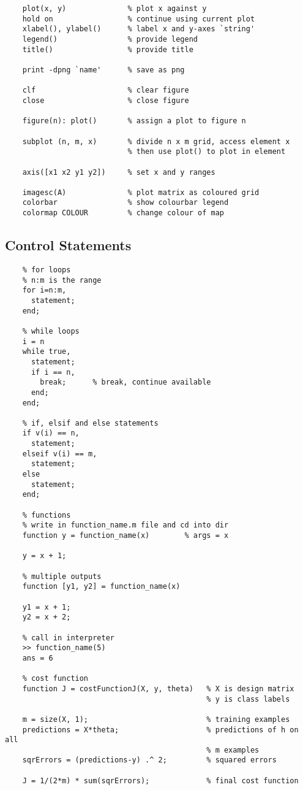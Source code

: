 \documentclass[12pt, a4paper]{article}
\begin{document}
    \begin{lstlisting}
    plot(x, y)              % plot x against y
    hold on                 % continue using current plot
    xlabel(), ylabel()      % label x and y-axes `string'
    legend()                % provide legend
    title()                 % provide title

    print -dpng `name'      % save as png

    clf                     % clear figure
    close                   % close figure

    figure(n): plot()       % assign a plot to figure n
    
    subplot (n, m, x)       % divide n x m grid, access element x
                            % then use plot() to plot in element

    axis([x1 x2 y1 y2])     % set x and y ranges

    imagesc(A)              % plot matrix as coloured grid
    colorbar                % show colourbar legend
    colormap COLOUR         % change colour of map
    \end{lstlisting}
    \vspace{1em}

  \subsection{Control Statements}

    \begin{lstlisting}
    % for loops
    % n:m is the range
    for i=n:m,
      statement;
    end;

    % while loops
    i = n
    while true,
      statement;
      if i == n,
        break;      % break, continue available
      end;
    end;

    % if, elsif and else statements
    if v(i) == n,
      statement;
    elseif v(i) == m,
      statement;
    else
      statement;
    end;

    % functions
    % write in function_name.m file and cd into dir
    function y = function_name(x)        % args = x

    y = x + 1;

    % multiple outputs
    function [y1, y2] = function_name(x)

    y1 = x + 1;
    y2 = x + 2;

    % call in interpreter
    >> function_name(5)
    ans = 6

    % cost function
    function J = costFunctionJ(X, y, theta)   % X is design matrix
                                              % y is class labels

    m = size(X, 1);                           % training examples 
    predictions = X*theta;                    % predictions of h on all 
                                              % m examples
    sqrErrors = (predictions-y) .^ 2;         % squared errors

    J = 1/(2*m) * sum(sqrErrors);             % final cost function
    \end{lstlisting}
    \vspace{1em}
\end{document}
